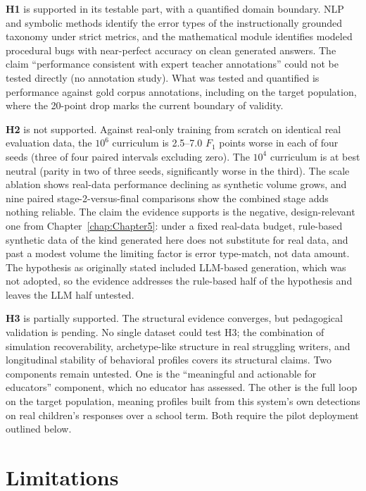 \textbf{H1} is supported in its testable part, with a quantified domain boundary. NLP and symbolic methods identify the error types of the instructionally grounded taxonomy under strict metrics, and the mathematical module identifies modeled procedural bugs with near-perfect accuracy on clean generated answers. The claim ``performance consistent with expert teacher annotations'' could not be tested directly (no annotation study). What was tested and quantified is performance against gold corpus annotations, including on the target population, where the 20-point drop marks the current boundary of validity.

\textbf{H2} is not supported. Against real-only training from scratch on identical real evaluation data, the $10^6$ curriculum is 2.5--7.0 $F_1$ points worse in each of four seeds (three of four paired intervals excluding zero). The $10^4$ curriculum is at best neutral (parity in two of three seeds, significantly worse in the third). The scale ablation shows real-data performance declining as synthetic volume grows, and nine paired stage-2-versus-final comparisons show the combined stage adds nothing reliable. The claim the evidence supports is the negative, design-relevant one from Chapter~\ref{chap:Chapter5}: under a fixed real-data budget, rule-based synthetic data of the kind generated here does not substitute for real data, and past a modest volume the limiting factor is error type-match, not data amount. The hypothesis as originally stated included LLM-based generation, which was not adopted, so the evidence addresses the rule-based half of the hypothesis and leaves the LLM half untested.

\textbf{H3} is partially supported. The structural evidence converges, but pedagogical validation is pending. No single dataset could test H3; the combination of simulation recoverability, archetype-like structure in real struggling writers, and longitudinal stability of behavioral profiles covers its structural claims. Two components remain untested. One is the ``meaningful and actionable for educators'' component, which no educator has assessed. The other is the full loop on the target population, meaning profiles built from this system's own detections on real children's responses over a school term. Both require the pilot deployment outlined below.

\section{Limitations}
\label{sec:concl_limit}

